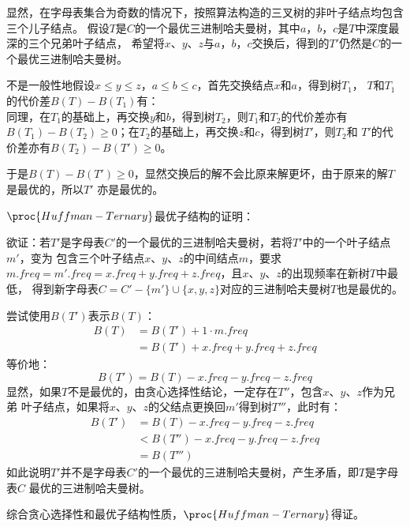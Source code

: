 \begin{solution}
    显然，在字母表集合为奇数的情况下，按照算法构造的三叉树的非叶子结点均包含三个儿子结点。
    假设$T$是$C$的一个最优三进制哈夫曼树，其中$a$，$b$，$c$是$T$中深度最深的三个兄弟叶子结点，
    希望将$x$、$y$、$z$与$a$，$b$，$c$交换后，得到的$T'$仍然是$C$的一个最优三进制哈夫曼树。

    不是一般性地假设$x \le y \le z$，$a \le b \le c$，首先交换结点$x$和$a$，得到树$T_1$，
    $T$和$T_1$的代价差$B(T)-B(T_1)$有：
    ~\\
    同理，在$T_1$的基础上，再交换$y$和$b$，得到树$T_2$，则$T_1$和$T_2$的代价差亦有
    $B(T_1)-B(T_2)\ge 0$；在$T_2$的基础上，再交换$z$和$c$，得到树$T'$，则$T_2$和
    $T'$的代价差亦有$B(T_2)-B(T')\ge 0$。

    于是$B(T)-B(T')\ge 0$，显然交换后的解不会比原来解更坏，由于原来的解$T$是最优的，所以$T'$
    亦是最优的。
    
    $\proc{Huffman-Ternary}$最优子结构的证明：

    欲证：若$T'$是字母表$C'$的一个最优的三进制哈夫曼树，若将$T'$中的一个叶子结点$m'$，变为
    包含三个叶子结点$x$、$y$、$z$的中间结点$m$，要求
    $m.freq = m'.freq = x.freq + y.freq + z.freq$，且$x$、$y$、$z$的出现频率在新树$T$中最低，
    得到新字母表$C=C'-\{m'\}\cup\{x,y,z\}$对应的三进制哈夫曼树$T$也是最优的。

    尝试使用$B(T')$表示$B(T)$：
    \begin{align*}
        B(T)    &= B(T') + 1 \cdot m.freq\\
                &= B(T') + x.freq + y.freq + z.freq
    \end{align*}
    等价地：
    $$B(T') = B(T) - x.freq - y.freq - z.freq$$
    显然，如果$T$不是最优的，由贪心选择性结论，一定存在$T''$，包含$x$、$y$、$z$作为兄弟
    叶子结点，如果将$x$、$y$、$z$的父结点更换回$m'$得到树$T'''$，此时有：
    \begin{align*}
        B(T')   &= B(T) - x.freq - y.freq - z.freq \\
                &< B(T'') - x.freq - y.freq - z.freq \\
                &= B(T''')
    \end{align*}
    如此说明$T'$并不是字母表$C'$的一个最优的三进制哈夫曼树，产生矛盾，即$T$是字母表$C$
    最优的三进制哈夫曼树。

    综合贪心选择性和最优子结构性质，$\proc{Huffman-Ternary}$得证。
\end{solution}